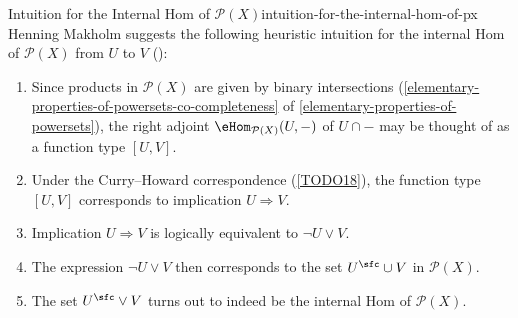 \begin{remark}{Intuition for the Internal Hom of $\mathcal{P}(X)$}{intuition-for-the-internal-hom-of-px}%
    Henning Makholm suggests the following heuristic intuition for the internal Hom of $\mathcal{P}(X)$ from $U$ to $V$ (\cite{MSE267365}):
    \begin{enumerate}
        \item\label{intuition-for-the-internal-hom-of-px-1}Since products in $\mathcal{P}(X)$ are given by binary intersections (\cref{elementary-properties-of-powersets-co-completeness} of \cref{elementary-properties-of-powersets}), the right adjoint $\eHom_{\mathcal{P}(X)}(U,-)$ of $U\cap-$ may be thought of as a function type $[U,V]$.
        \item\label{intuition-for-the-internal-hom-of-px-2}Under the Curry--Howard correspondence (\cref{TODO18}), the function type $[U,V]$ corresponds to implication $U\Rightarrow V$.
        \item\label{intuition-for-the-internal-hom-of-px-3}Implication $U\Rightarrow V$ is logically equivalent to $\neg U\vee V$.
        \item\label{intuition-for-the-internal-hom-of-px-4}The expression $\neg U\vee V$ then corresponds to the set $U^{\sfc}\cup V$ in $\mathcal{P}(X)$.
        \item\label{intuition-for-the-internal-hom-of-px-5}The set $U^{\sfc}\vee V$ turns out to indeed be the internal Hom of $\mathcal{P}(X)$.
    \end{enumerate}
\end{remark}
